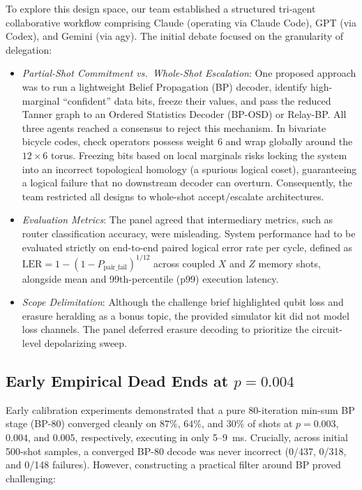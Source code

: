 To explore this design space, our team established a structured tri-agent collaborative workflow comprising Claude (operating via Claude Code), GPT (via Codex), and Gemini (via agy). The initial debate focused on the granularity of delegation:
\begin{itemize}
    \item \textit{Partial-Shot Commitment vs.\ Whole-Shot Escalation}: One proposed approach was to run a lightweight Belief Propagation (BP) decoder, identify high-marginal ``confident'' data bits, freeze their values, and pass the reduced Tanner graph to an Ordered Statistics Decoder (BP-OSD) or Relay-BP. All three agents reached a consensus to reject this mechanism. In bivariate bicycle codes, check operators possess weight 6 and wrap globally around the $12 \times 6$ torus. Freezing bits based on local marginals risks locking the system into an incorrect topological homology (a spurious logical coset), guaranteeing a logical failure that no downstream decoder can overturn. Consequently, the team restricted all designs to whole-shot accept/escalate architectures.
    \item \textit{Evaluation Metrics}: The panel agreed that intermediary metrics, such as router classification accuracy, were misleading. System performance had to be evaluated strictly on end-to-end paired logical error rate per cycle, defined as $\text{LER} = 1 - (1 - P_{\text{pair\_fail}})^{1/12}$ across coupled $X$ and $Z$ memory shots, alongside mean and 99th-percentile (p99) execution latency.
    \item \textit{Scope Delimitation}: Although the challenge brief highlighted qubit loss and erasure heralding as a bonus topic, the provided simulator kit did not model loss channels. The panel deferred erasure decoding to prioritize the circuit-level depolarizing sweep.
\end{itemize}

\subsection{Early Empirical Dead Ends at $p = 0.004$}

Early calibration experiments demonstrated that a pure 80-iteration min-sum BP stage (BP-80) converged cleanly on $87\%$, $64\%$, and $30\%$ of shots at $p = 0.003$, $0.004$, and $0.005$, respectively, executing in only 5--9~ms. Crucially, across initial 500-shot samples, a converged BP-80 decode was never incorrect (0/437, 0/318, and 0/148 failures). However, constructing a practical filter around BP proved challenging:

